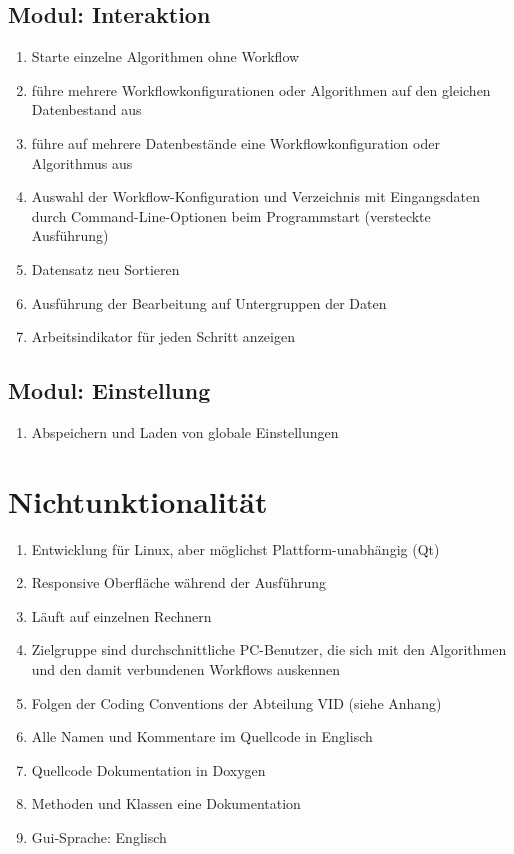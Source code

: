 	\subsection{Modul: Interaktion}
		\begin{enumerate}[ align=left, label={\textbf{\textbackslash FK3\arabic*0\textbackslash}} ]
			\item Starte einzelne Algorithmen ohne Workflow
			\item führe mehrere Workflowkonfigurationen oder Algorithmen  auf den gleichen Datenbestand aus
			\item führe auf mehrere Datenbestände eine Workflowkonfiguration oder Algorithmus aus
			\item Auswahl der Workflow-Konfiguration und Verzeichnis mit Eingangsdaten durch Command-Line-Optionen beim Programmstart (versteckte Ausführung)
			\item Datensatz neu Sortieren
			\item Ausführung der Bearbeitung auf Untergruppen der Daten
			\item Arbeitsindikator für jeden Schritt anzeigen
		\end{enumerate}

	\subsection{Modul: Einstellung}
		\begin{enumerate}[ align=left, label={\textbf{\textbackslash FK4\arabic*0\textbackslash}} ]
		\item Abspeichern und Laden von globale Einstellungen
		\end{enumerate}

\section{Nichtunktionalität}
		\begin{enumerate}[ align=left, label={\textbf{\textbackslash NF1\arabic*0\textbackslash}} ]
			\item Entwicklung für Linux, aber möglichst Plattform-unabhängig (Qt)
			\item Responsive Oberfläche während der Ausführung
			\item Läuft auf einzelnen Rechnern
			\item Zielgruppe sind durchschnittliche PC-Benutzer, die sich mit den Algorithmen und den damit verbundenen Workflows auskennen
			\item Folgen der Coding Conventions der Abteilung VID (siehe Anhang)
			\item Alle Namen und Kommentare im Quellcode in Englisch
			\item Quellcode Dokumentation in Doxygen
			\item Methoden und Klassen eine Dokumentation
			\item Gui-Sprache: Englisch
		\end{enumerate}

